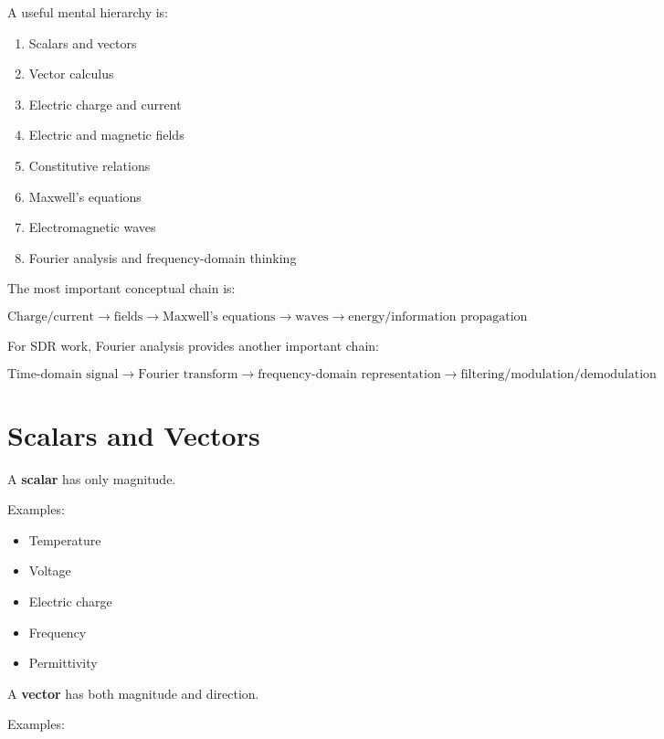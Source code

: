 \documentclass[11pt]{article}
\begin{document}
A useful mental hierarchy is:

\begin{enumerate}
    \item Scalars and vectors
    \item Vector calculus
    \item Electric charge and current
    \item Electric and magnetic fields
    \item Constitutive relations
    \item Maxwell's equations
    \item Electromagnetic waves
    \item Fourier analysis and frequency-domain thinking
\end{enumerate}

The most important conceptual chain is:

\[
\boxed{
\text{Charge/current}
\rightarrow
\text{fields}
\rightarrow
\text{Maxwell's equations}
\rightarrow
\text{waves}
\rightarrow
\text{energy/information propagation}
}
\]

For SDR work, Fourier analysis provides another important chain:

\[
\boxed{
\text{Time-domain signal}
\rightarrow
\text{Fourier transform}
\rightarrow
\text{frequency-domain representation}
\rightarrow
\text{filtering/modulation/demodulation}
}
\]



\section{Scalars and Vectors}

A \textbf{scalar} has only magnitude.

Examples:

\begin{itemize}
    \item Temperature
    \item Voltage
    \item Electric charge
    \item Frequency
    \item Permittivity
\end{itemize}

A \textbf{vector} has both magnitude and direction.

Examples:
\end{document}
